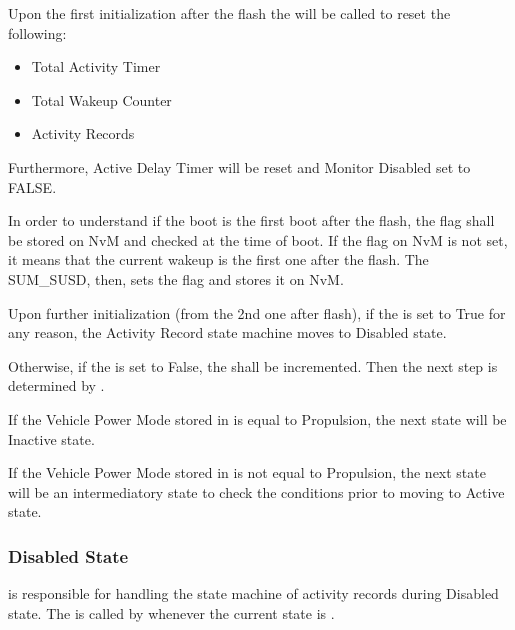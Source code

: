{Upon the first initialization after the flash the  will be called to reset the following:
\begin{itemize}
	\item Total Activity Timer
	\item Total Wakeup Counter
	\item Activity Records
\end{itemize}
Furthermore, Active Delay Timer will be reset and Monitor Disabled set to FALSE.
}
{  }

{In order to understand if the boot is the first boot after the flash, the flag  shall be stored on NvM and checked at the time of boot. 
If the flag on NvM is not set, it means that the current wakeup is the first one after the flash. The SUM_SUSD, then, sets the flag and stores it on NvM.}
{}

{Upon further initialization (from the 2nd one after flash), if the  is set to True for any reason, the Activity Record state machine moves to Disabled state.}
{}

{Otherwise, if the  is set to False, the  shall be incremented. Then the next step is determined by .}
{}

{If the Vehicle Power Mode stored in  is equal to Propulsion, the next state will be Inactive state.}
{}

{If the Vehicle Power Mode stored in  is not equal to Propulsion, the next state will be an intermediatory state  to check the conditions prior to moving to Active state.}
{}



\subsubsection{Disabled State}

{ is responsible for handling the state machine of activity records during Disabled state. 
The  is called by  whenever the current state is .}
{}

